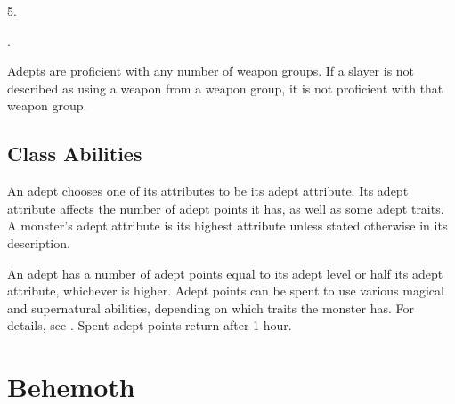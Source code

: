          5.

         .

        Adepts are proficient with any number of weapon groups.
        If a slayer is not described as using a weapon from a weapon group, it is not proficient with that weapon group.

    \subsection{Class Abilities}

         An adept chooses one of its attributes to be its adept attribute.
        Its adept attribute affects the number of adept points it has, as well as some adept traits.
        A monster's adept attribute is its highest attribute unless stated otherwise in its description.

         An adept has a number of adept points equal to its adept level or half its adept attribute, whichever is higher.
        Adept points can be spent to use various magical and supernatural abilities, depending on which traits the monster has.
        For details, see .
        Spent adept points return after 1 hour.

\section{Behemoth}\label{Behemoth}

